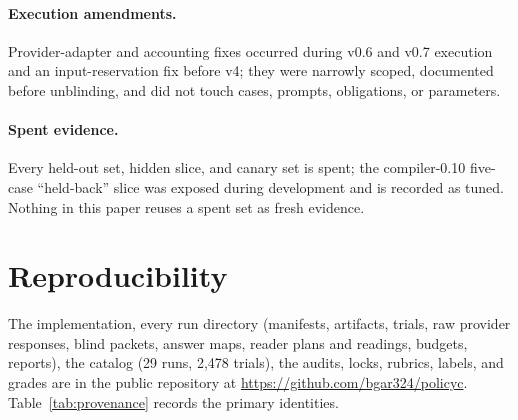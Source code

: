 \documentclass[11pt]{article}
\begin{document}
\paragraph{Execution amendments.} Provider-adapter and accounting fixes occurred during v0.6 and v0.7 execution and an input-reservation fix before v4; they were narrowly scoped, documented before unblinding, and did not touch cases, prompts, obligations, or parameters.

\paragraph{Spent evidence.} Every held-out set, hidden slice, and canary set is spent; the compiler-0.10 five-case ``held-back'' slice was exposed during development and is recorded as tuned. Nothing in this paper reuses a spent set as fresh evidence.

\section{Reproducibility}
\label{sec:repro}

The implementation, every run directory (manifests, artifacts, trials, raw provider responses, blind packets, answer maps, reader plans and readings, budgets, reports), the catalog (29 runs, 2{,}478 trials), the audits, locks, rubrics, labels, and grades are in the public repository at \url{https://github.com/bgar324/policyc}. Table~\ref{tab:provenance} records the primary identities.
\end{document}
